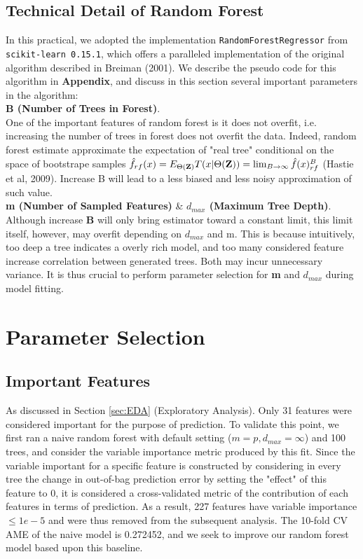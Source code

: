 \documentclass[11pt]{article}
\theoremstyle{definition}
\begin{document}
\subsection{\textbf{Technical Detail of Random Forest}}
In this practical, we adopted the implementation {\tt RandomForestRegressor} from {\tt scikit-learn 0.15.1}, which offers a paralleled implementation of the original algorithm described in Breiman (2001). We describe the pseudo code for this algorithm in \textbf{Appendix}, and discuss in this section several important parameters in the algorithm:\\

\textbf{B (Number of Trees in Forest)}. \\
One of the important features of random forest is it does not overfit, i.e. increasing the number of trees in forest does not overfit the data. Indeed, random forest estimate approximate the expectation of "real tree" conditional on the space of bootstrape samples $\hat{f}_{rf}(x) = E_{\Theta({\bf Z})}T(x|\Theta({\bf Z})) = \lim_{B \rightarrow \infty} \hat{f}(x)_{rf}^B$ (Hastie et al, 2009). Increase B will lead to a less biased and less noisy approximation of such value.\\

\textbf{m (Number of Sampled Features)} \& \textbf{$d_{max}$ (Maximum Tree Depth)}. \\
Although increase \textbf{B} will only bring estimator toward a constant limit, this limit itself, however, may overfit depending on $d_{max}$ and m. This is because intuitively, too deep a tree indicates a overly rich model, and too many considered feature increase correlation between generated trees. Both may incur unnecessary variance. It is thus crucial to perform parameter selection for \textbf{m} and \textbf{$d_{max}$} during model fitting.


\section{\textbf{Parameter Selection}}
\subsection{\textbf{Important Features}}

As discussed in Section \ref{sec:EDA} (Exploratory Analysis). Only 31 features were considered important for the purpose of prediction. To validate this point, we first ran a naive random forest with default setting ($m = p, d_{max} = \infty$) and 100 trees, and consider the variable importance metric produced by this fit. Since the variable important for a specific feature  is constructed by considering in every tree the change in out-of-bag prediction error by setting the "effect" of this feature to 0, it is considered a cross-validated metric of the contribution of each features in terms of prediction. As a result, 227 features have variable importance $\leq 1e-5$ and were thus removed from the subsequent analysis. The 10-fold CV AME of the naive model is 0.272452, and we seek to improve our random forest model based upon this baseline.
\end{document}
